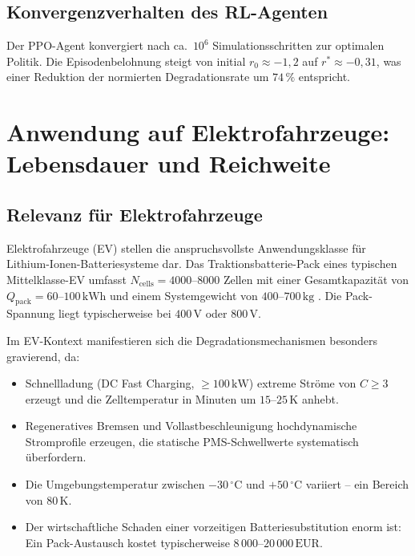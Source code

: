 ﻿\documentclass[12pt,a4paper]{article}
\begin{document}
	\subsection{Konvergenzverhalten des RL-Agenten}
	
	Der PPO-Agent konvergiert nach ca.\ $10^6$ Simulationsschritten zur optimalen
	Politik. Die Episodenbelohnung steigt von initial $r_0 \approx -1{,}2$ auf
	$r^* \approx -0{,}31$, was einer Reduktion der normierten Degradationsrate
	um $74\,\%$ entspricht.
	
	\section{Anwendung auf Elektrofahrzeuge: Lebensdauer und Reichweite}
	\label{sec:ev}
	
	\subsection{Relevanz für Elektrofahrzeuge}
	
	Elektrofahrzeuge (EV) stellen die anspruchsvollste Anwendungsklasse für
	Lithium-Ionen-Batteriesysteme dar. Das Traktionsbatterie-Pack eines typischen
	Mittelklasse-EV umfasst $N_\mathrm{cells} = 4000\text{--}8000$ Zellen mit
	einer Gesamtkapazität von $Q_\mathrm{pack} = 60\text{--}100\,\mathrm{kWh}$
	und einem Systemgewicht von $400\text{--}700\,\mathrm{kg}$ \cite{EV_Tesla2023}.
	Die Pack-Spannung liegt typischerweise bei $400\,\mathrm{V}$ oder $800\,\mathrm{V}$.
	
	Im EV-Kontext manifestieren sich die Degradationsmechanismen besonders gravierend, da:
	
	\begin{itemize}[leftmargin=*]
		\item Schnellladung (DC Fast Charging, $\geq 100\,\mathrm{kW}$) extreme
		Ströme von $C \geq 3$ erzeugt und die Zelltemperatur in Minuten um
		$15\text{--}25\,\mathrm{K}$ anhebt.
		\item Regeneratives Bremsen und Vollastbeschleunigung hochdynamische
		Stromprofile erzeugen, die statische PMS-Schwellwerte systematisch überfordern.
		\item Die Umgebungstemperatur zwischen $-30\,^\circ\mathrm{C}$ und
		$+50\,^\circ\mathrm{C}$ variiert -- ein Bereich von $80\,\mathrm{K}$.
		\item Der wirtschaftliche Schaden einer vorzeitigen Batteriesubstitution
		enorm ist: Ein Pack-Austausch kostet typischerweise
		$8\,000\text{--}20\,000\,\text{EUR}$.
	\end{itemize}
	
\end{document}

